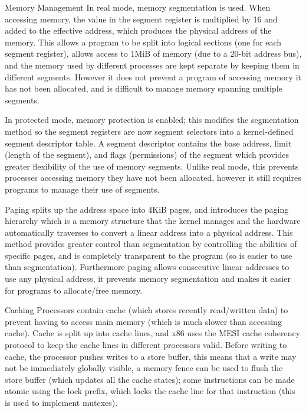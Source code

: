 \documentclass[final]{beamer}
\newlength{\colwidth}
\begin{document}
\begin{frame}[t]
\begin{columns}[t]
\begin{column}{\colwidth}
\begin{block}{Memory Management}
    In real mode, memory segmentation is used.
    When accessing memory, the value in the segment register is multiplied by 16 and added to the effective address, which produces the physical address of the memory.
    This allows a program to be split into logical sections (one for each segment register), allows access to 1MiB of memory (due to a 20-bit address bus), and the memory used by different processes are kept separate by keeping them in different segments.
    However it does not prevent a program of accessing memory it has not been allocated, and is difficult to manage memory spanning multiple segments.

    In protected mode, memory protection is enabled; this modifies the segmentation method so the segment registers are now segment selectors into a kernel-defined segment descriptor table.
    A segment descriptor contains the base address, limit (length of the segment), and flags (permissions) of the segment which provides greater flexibility of the use of memory segments.
    Unlike real mode, this prevents processes accessing memory they have not been allocated, however it still requires programs to manage their use of segments.

    Paging splits up the address space into 4KiB pages, and introduces the paging hierarchy which is a memory structure that the kernel manages and the hardware automatically traverses to convert a linear address into a physical address.
    This method provides greater control than segmentation by controlling the abilities of specific pages, and is completely transparent to the program (so is easier to use than segmentation).
    Furthermore paging allows consecutive linear addresses to use any physical address, it prevents memory segmentation and makes it easier for programs to allocate/free memory.
  \end{block}

  \begin{block}{Caching}
    Processors contain cache (which stores recently read/written data) to prevent having to access main memory (which is much slower than accessing cache).
    Cache is split up into cache lines, and x86 uses the MESI cache coherency protocol to keep the cache lines in different processors valid.
    Before writing to cache, the processor pushes writes to a store buffer, this means that a write may not be immediately globally visible, a memory fence can be used to flush the store buffer (which updates all the cache states); some instructions can be made atomic using the lock prefix, which locks the cache line for that instruction (this is used to implement mutexes).


\end{block}
\end{column}
\end{columns}
\end{frame}
\end{document}
